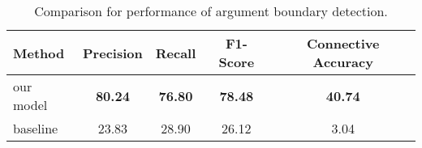 \begin{table}[ht]
\centering
\begin{tabular}{|l|c|c|c|c|}
\hline

    Method          &     Precision &     Recall &     F1-Score &     Connective Accuracy \\ \hline
    our model       & \bf 80.24     & \bf 76.80  & \bf 78.48    & \bf 40.74               \\ \hline
    baseline        &     23.83     &     28.90  &     26.12    &      3.04               \\ \hline

\end{tabular}
\caption{\label{t:argument-baseline} Comparison for performance of argument boundary detection. }
\end{table}
